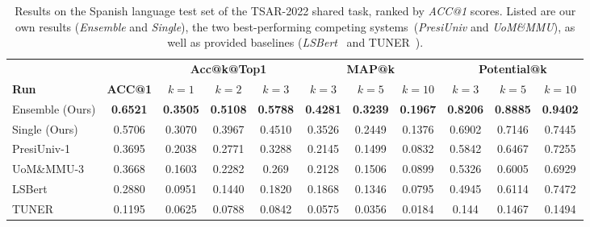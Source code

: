 \documentclass[11pt]{article}
\begin{document}
\begin{table*}
	\hspace*{-0.35cm}
	\setlength{\tabcolsep}{4pt}
	\centering
	\begin{tabular}{l|c|ccc|ccc|ccc}
		&       & \multicolumn{3}{|c|}{\textbf{Acc@k@Top1}} & \multicolumn{3}{c|}{\textbf{MAP@k}} & \multicolumn{3}{c}{\textbf{Potential@k}}\\
		\textbf{Run} & \textbf{ACC@1} & $k=1$ & $k=2$ & $k=3$ & $k=3$ & $k=5$ & $k=10$ & $k=3$ & $k=5$ & $k=10$\\
		\hline
		Ensemble (Ours) & \textbf{0.6521} & \textbf{0.3505} & \textbf{0.5108} & \textbf{0.5788} & \textbf{0.4281} & \textbf{0.3239} & \textbf{0.1967} & \textbf{0.8206} & \textbf{0.8885} & \textbf{0.9402}\\
		Single (Ours) & 0.5706 & 0.3070 & 0.3967 & 0.4510 & 0.3526 & 0.2449 & 0.1376 & 0.6902 & 0.7146 & 0.7445\\
		\hline
		PresiUniv-1 & 0.3695 & 0.2038 & 0.2771 & 0.3288 & 0.2145 & 0.1499 & 0.0832 & 0.5842 & 0.6467 & 0.7255\\
		UoM\&MMU-3 & 0.3668 & 0.1603 & 0.2282 & 0.269 & 0.2128 & 0.1506 & 0.0899 & 0.5326 & 0.6005 & 0.6929\\
		LSBert & 0.2880 & 0.0951 & 0.1440 & 0.1820 & 0.1868 & 0.1346 & 0.0795 & 0.4945 & 0.6114 & 0.7472\\
		TUNER & 0.1195 & 0.0625 & 0.0788 & 0.0842 & 0.0575 & 0.0356 & 0.0184 & 0.144 & 0.1467 & 0.1494 \\
	\end{tabular}
	\caption{Results on the Spanish language test set of the TSAR-2022 shared task, ranked by \emph{ACC@1} scores. Listed are our own results (\emph{Ensemble} and  \emph{Single}), the two best-performing competing systems~(\emph{PresiUniv} and \emph{UoM\&MMU}), as well as provided baselines (\emph{LSBert}~\cite{qiang-etal-2020-lexical} and TUNER~\cite{ferres-etal-2017-adaptable}).}
	\label{tab:spanish}
\end{table*}
	
\end{document}
